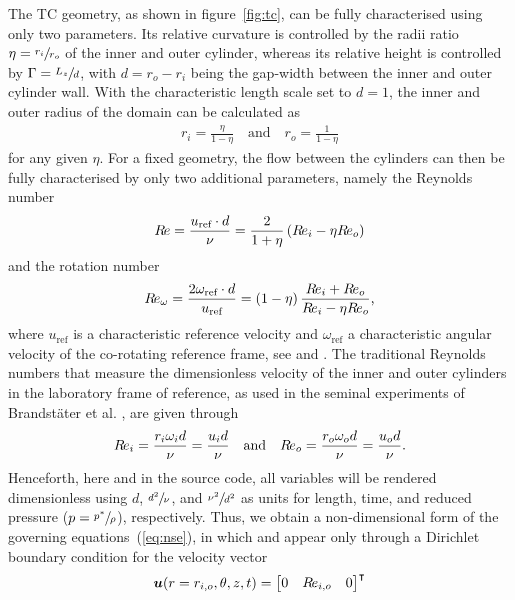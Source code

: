 \documentclass[a4paper, 11pt, DIV=11]{scrartcl}
\begin{document}
The TC geometry, as shown in figure~\ref{fig:tc}, can be fully characterised using
only two parameters. Its relative curvature is controlled by the radii ratio
$\eta=\sfrac{r_i}{r_o}$ of the inner and outer cylinder, whereas its relative height
is controlled by $\Gamma=\sfrac{L_z}{d}$, with $d=r_{o}-r_{i}$ being the gap-width
between the inner and outer cylinder wall. With the characteristic length scale set
to $d=1$, the inner and outer radius of the domain can be calculated as
\begin{align}
r_{i} = \frac{\eta}{1-\eta}
\quad\text{and}\quad
r_{o} = \frac{1}{1-\eta}
\end{align}
for any given $\eta$. For a fixed geometry, the flow between the cylinders can then
be fully characterised by only two additional parameters, namely the Reynolds number
\begin{align}
R\hspace{-0.1em}e = \frac{u_{\text{ref}}\cdot d}{\nu}
=\frac{2}{1+\eta}\left(R\hspace{-0.1em}e_{i}-\eta R\hspace{-0.1em}e_{o}\right)
\end{align}
and the rotation number
\begin{align}
R\hspace{-0.1em}e_{\omega} = \frac{2\omega_{\text{ref}}\cdot d}{u_{\text{ref}}} =
\left(1-\eta\right) \frac{R\hspace{-0.1em}e_{i}+R\hspace{-0.1em}e_{o}}{R\hspace{-0.1em}e_{i}-\eta R\hspace{-0.1em}e_{o}}
\text{,}
\end{align}
where $u_{\text{ref}}$ is a characteristic reference velocity and
$\omega_{\text{ref}}$ a characteristic angular velocity of the co-rotating reference
frame, see \eg \cite{Dubrulle2005a} and \cite{Brauckmann2016}. The traditional Reynolds
numbers that measure the dimensionless velocity of the inner and outer cylinders in the
laboratory frame of reference, as \eg used in the seminal experiments of Brandstäter
et al. \cite{Brandstater1983, Brandstater1987}, are given through
\begin{align}
R\hspace{-0.1em}e_{i} = \frac{r_{i}\omega_{i}d}{\nu} = \frac{u_{i}d}{\nu}
\hspace{1em}\text{and}\hspace{1em}
R\hspace{-0.1em}e_{o} = \frac{r_{o}\omega_{o}d}{\nu} = \frac{u_{o}d}{\nu}
\text{.}
\label{eq:reynoldsIO}
\end{align}
Henceforth, here and in the source code, all variables will be rendered dimensionless
using $d$, $\sfrac{d^2}{\nu}$, and $\sfrac{\nu^2}{d^2}$ as units for length, time,
and reduced pressure ($p=\sfrac{p^{\ast}}{\rho}$), respectively. Thus, we obtain a
non-dimensional form of the governing equations~(\ref{eq:nse}), in which \Rei and \Reo
appear only through a Dirichlet boundary condition for the velocity vector
\begin{align}
\boldsymbol{u}(r=r_{i,o}, \theta, z, t) =
\begin{bmatrix}
0 & R\hspace{-0.1em}e_{i,o} & 0 
\end{bmatrix}^{\intercal}
\label{eq:noslipBC}
\end{align}
\end{document}
